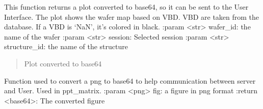 \documentclass[letterpaper,10pt,english]{sphinxmanual}
\begin{document}

\begin{fulllineitems}
\label{\detokenize{VBD:VBD.create_wafer_map}}
\pysigstartsignatures
{}
\pysigstopsignatures
\sphinxAtStartPar
This function returns a plot converted to base64, so it can be sent to the User Interface. The plot shows the wafer map based on VBD.
VBD are taken from the database. If a VBD is ‘NaN’, it’s colored in black.
:param \textless{}str\textgreater{} wafer\_id: the name of the wafer
:param \textless{}str\textgreater{} session: Selected session
:param \textless{}str\textgreater{} structure\_id: the name of the structure
\begin{quote}\begin{description}
\sphinxAtStartPar
Plot converted to base64

\end{description}\end{quote}

\end{fulllineitems}


\begin{fulllineitems}
\label{\detokenize{VBD:VBD.fig_to_base64}}
\pysigstartsignatures
{}
\pysigstopsignatures
\sphinxAtStartPar
Function used to convert a png to base64 to help communication between server and User. Used in ppt\_matrix.
:param \textless{}png\textgreater{} fig: a figure in png format
:return \textless{}base64\textgreater{}: The converted figure

\end{fulllineitems}

\end{document}
